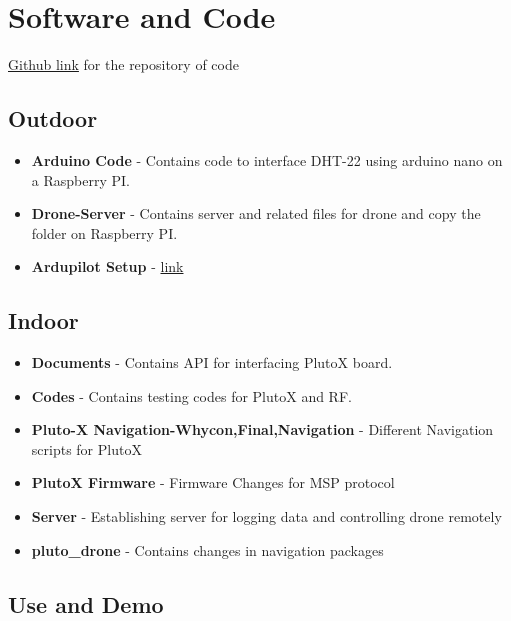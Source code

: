 \documentclass[a4paper,12pt,oneside]{book}
\begin{document}
\section{Software and Code}
\href{https://github.com/eYSIP-2018/Flying-Sensor-Node/}{Github link} for the repository of code

\subsection*{Outdoor}
\begin{itemize}
\item \textbf{Arduino Code} - Contains code to interface DHT-22 using arduino nano on a Raspberry PI.
\item \textbf{Drone-Server} - Contains server and related files for drone and copy the folder on Raspberry PI.
\item \textbf{Ardupilot Setup} - \href{https://docs.emlid.com/navio2/}{link}

\end{itemize}

\subsection*{Indoor}
\begin{itemize}
\item \textbf{Documents} - Contains API for interfacing PlutoX board.
\item \textbf{Codes} - Contains testing codes for PlutoX and RF.
\item \textbf{Pluto-X Navigation-Whycon,Final,Navigation} - Different Navigation scripts for PlutoX
\item \textbf{PlutoX Firmware} - Firmware Changes for MSP protocol
\item \textbf{Server} - Establishing server for logging data and controlling drone remotely
\item \textbf{pluto\_drone} - Contains changes in navigation packages 
\end{itemize}


\subsection*{Use and Demo}
\end{document}
